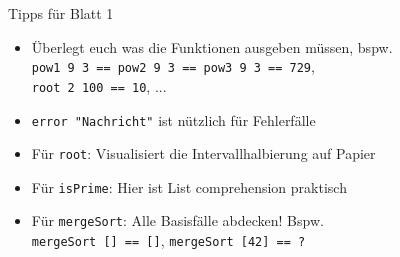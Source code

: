 \documentclass{beamer}
\begin{document}
\begin{frame}{Tipps für Blatt 1}
  \begin{itemize}
    \item Überlegt euch was die Funktionen ausgeben müssen, bspw.\\
      \texttt{pow1 9 3 == pow2 9 3 == pow3 9 3 == 729},\\ \texttt{root 2 100 == 10}, ...
    \item \texttt{error "Nachricht"} ist nützlich für Fehlerfälle
    \item Für \texttt{root}: Visualisiert die Intervallhalbierung auf Papier
    \item Für \texttt{isPrime}: Hier ist List comprehension praktisch
    \item Für \texttt{mergeSort}: Alle Basisfälle abdecken! Bspw.\\
      \texttt{mergeSort [] == []}, \texttt{mergeSort [42] == ?}
  \end{itemize}
\end{frame}
\end{document}
